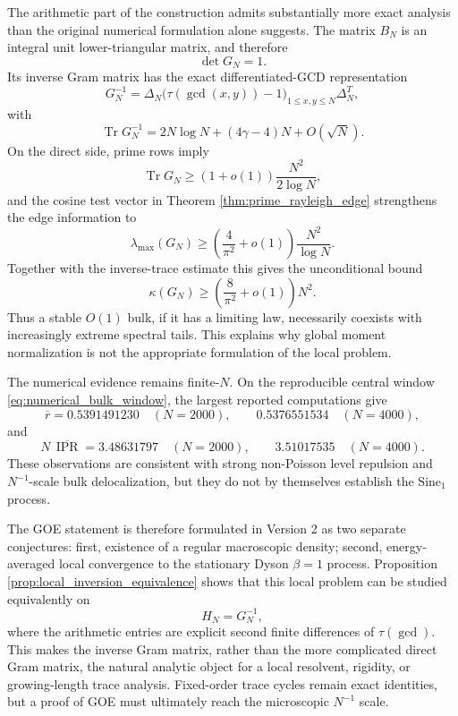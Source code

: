 \documentclass[11pt]{amsart}
\numberwithin{equation}{section}
\theoremstyle{plain}
\theoremstyle{definition}
\theoremstyle{remark}
\newcommand{\Tr}{\operatorname{Tr}}
\newcommand{\IPR}{\operatorname{IPR}}
\begin{document}
The arithmetic part of the construction admits substantially more exact analysis than the original numerical formulation alone suggests.  The matrix $B_N$ is an integral unit lower-triangular matrix, and therefore
\begin{equation}
\det G_N=1.
\end{equation}
Its inverse Gram matrix has the exact differentiated-GCD representation
\begin{equation}
G_N^{-1}=\Delta_N
\bigl(\tau(\gcd(x,y))-1\bigr)_{1\le x,y\le N}
\Delta_N^T,
\end{equation}
with
\begin{equation}
\Tr G_N^{-1}
=2N\log N+(4\gamma-4)N+O(\sqrt N).
\end{equation}
On the direct side, prime rows imply
\begin{equation}
\Tr G_N\ge(1+o(1))\frac{N^2}{2\log N},
\end{equation}
and the cosine test vector in Theorem \ref{thm:prime_rayleigh_edge} strengthens the edge information to
\begin{equation}
\lambda_{\max}(G_N)
\ge\left(\frac4{\pi^2}+o(1)\right)\frac{N^2}{\log N}.
\end{equation}
Together with the inverse-trace estimate this gives the unconditional bound
\begin{equation}
\kappa(G_N)
\ge\left(\frac8{\pi^2}+o(1)\right)N^2.
\end{equation}
Thus a stable $O(1)$ bulk, if it has a limiting law, necessarily coexists with increasingly extreme spectral tails.  This explains why global moment normalization is not the appropriate formulation of the local problem.

The numerical evidence remains finite-$N$.  On the reproducible central window \eqref{eq:numerical_bulk_window}, the largest reported computations give
\begin{equation}
\overline r
=0.5391491230\quad(N=2000),
\qquad
0.5376551534\quad(N=4000),
\end{equation}
and
\begin{equation}
N\,\overline{\IPR}
=3.48631797\quad(N=2000),
\qquad
3.51017535\quad(N=4000).
\end{equation}
These observations are consistent with strong non-Poisson level repulsion and $N^{-1}$-scale bulk delocalization, but they do not by themselves establish the $\mathrm{Sine}_1$ process.

The GOE statement is therefore formulated in Version 2 as two separate conjectures: first, existence of a regular macroscopic density; second, energy-averaged local convergence to the stationary Dyson $\beta=1$ process.  Proposition \ref{prop:local_inversion_equivalence} shows that this local problem can be studied equivalently on
\begin{equation}
H_N=G_N^{-1},
\end{equation}
where the arithmetic entries are explicit second finite differences of $\tau(\gcd)$.  This makes the inverse Gram matrix, rather than the more complicated direct Gram matrix, the natural analytic object for a local resolvent, rigidity, or growing-length trace analysis.  Fixed-order trace cycles remain exact identities, but a proof of GOE must ultimately reach the microscopic $N^{-1}$ scale.
\end{document}
